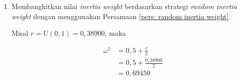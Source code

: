 {{\begin{enumerate}[align = left, left = 0cm, nolistsep]
\begin{enumerate}[label = (\alph*), align = left, left = 0cm, nolistsep]
                        {\footnotesize
                        \begin{equation*}
                            \begin{aligned}
                                \text{biaya syuting} & = f(G_{best}^{0}) \cdot (\operatorname{max}(\text{biaya \textit{scene}}) - \operatorname{min}(\text{biaya \textit{scene}})) + \operatorname{min}(\text{biaya \textit{scene}}) \\
                                                     & = 19,80464 \cdot (\text{Rp}580.109,48-\text{Rp}0) + \text{Rp}0                                                                                                                \\
                                                     & = \text{Rp} 11.488.859.41199
                            \end{aligned}
                        \end{equation*}
                        }

                        Kemudian, diubah indeks \textit{scene} pada rute $G_{best}$ agar didapatkan urutan syuting \textit{scene}  yaitu 4-19-22C-31-1C-21B-10-29B-25-27-23B-34-26-3-32B-14B-11-1D-23A-13-12B-29A-21A-22B-15-32A-30A-37-19B-2A-1E-30B-36-9A-35A-6A-35B-22A-33A-20-16A-24-16D-12A-7A-5-2B-28-16B- \newline
                        34B-14A-17-30C-6B-16C-9B-7B-33B-8-18-4.

              \end{enumerate}

              Karena tahap inisialisasi termasuk ke dalam iterasi $i = 0$ dan iterasi kurang dari iterasi maksimum sehingga iterasi dilanjutkan.

              \textbf{Iterasi ke-1} $(i = 1)$
              \vspace{-1mm}

        \item Membangkitkan nilai \textit{inertia weight} berdasarkan strategi \textit{random inertia weight} dengan menggunakan Persamaan \ref{pers: random inertia weight}. \par\nobreak
              Misal $r = U(0,1) = 0,38900$, maka

              \begin{equation*}
                  \begin{aligned}
                      \omega^{1} & = 0,5 + \frac{r}{2}       \\
                                 & = 0,5 + \frac{0,38900}{2} \\
                                 & = 0,69450
                  \end{aligned}
              \end{equation*}


\end{enumerate}}}
